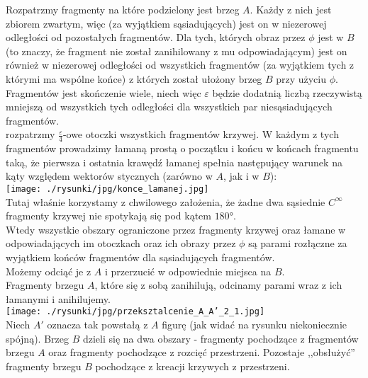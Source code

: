 \documentclass[a4paper, 12pt, twosided]{article}
\newcommand{\rysunek}[1]{\hfill \break\\[16pt] \Huge \textbf{\textcolor{violet}{Brakujący rysunek 
\normalsize
#1}} \hfill
\break \\[16pt] \normalsize}
\begin{document}
Rozpatrzmy fragmenty na które podzielony jest brzeg $A$. Każdy z nich jest zbiorem zwartym, więc
(za wyjątkiem sąsiadujących) jest on w niezerowej odległości od pozostałych fragmentów. Dla tych, 
których
 obraz przez $\phi$ jest w $B$ (to znaczy, że fragment nie został zanihilowany z mu odpowiadającym)
 jest on również w niezerowej odległości od wszystkich fragmentów (za wyjątkiem tych z którymi ma 
 wspólne
 końce) z których został ułożony brzeg $B$ przy  użyciu $\phi$.  \\
Fragmentów jest skończenie wiele, niech więc $\varepsilon$ będzie dodatnią liczbą rzeczywistą 
mniejszą
od wszystkich tych odległości dla wszystkich par niesąsiadujących fragmentów. \\
rozpatrzmy $\frac{\varepsilon}{4}$-owe otoczki wszystkich fragmentów krzywej. W każdym z tych 
fragmentów
prowadzimy
łamaną prostą o początku i końcu w końcach fragmentu taką, że pierwsza i ostatnia krawędź łamanej
\label{180 stopni} spełnia
następujący warunek na kąty względem wektorów stycznych (zarówno w $A$, jak i w $B$): \\
\texttt{[image: ./rysunki/jpg/konce\_lamanej.jpg]} \\ %
Tutaj właśnie korzystamy z chwilowego założenia, że żadne dwa sąsiednie $C^\infty$ fragmenty 
 krzywej 
nie spotykają się pod kątem $180\si{\degree}$. \\
Wtedy wszystkie obszary ograniczone przez fragmenty krzywej oraz łamane w odpowiadających im
otoczkach oraz ich obrazy przez $\phi$ są parami rozłączne za wyjątkiem końców fragmentów dla
sąsiadujących fragmentów. \\
Możemy odciąć je z $A$ i przerzucić w odpowiednie miejsca na $B$. \\
Fragmenty brzegu $A$, które się z sobą zanihilują, odcinamy parami wraz z ich łamanymi i
anihilujemy. \\
\texttt{[image: ./rysunki/jpg/przeksztalcenie\_A\_A'\_2\_1.jpg]} \\
Niech $A'$ oznacza tak powstałą z $A$ figurę (jak widać na rysunku niekoniecznie spójną).
Brzeg $B$ dzieli się na dwa obszary - fragmenty pochodzące z fragmentów brzegu $A$ oraz fragmenty
pochodzące z rozcięć przestrzeni.
Pozostaje ,,obsłużyć'' fragmenty brzegu $B$ pochodzące z kreacji krzywych z przestrzeni. \\
\end{document}
